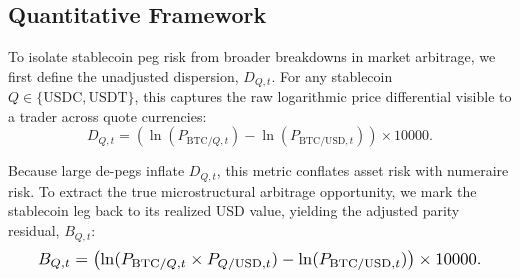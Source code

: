 \documentclass[12pt,twocolumn]{article}
\begin{document}
\begin{table}[H]
\label{tab:data_coverage}
\footnotesize
{}
\caption{1-minute data coverage and forward-fill exposure on the unified UTC grid. Coverage = non-missing share; FF share = carry-forward share (max 5 minutes).}
\end{table}

\subsection{Quantitative Framework}

To isolate stablecoin peg risk from broader breakdowns in market arbitrage, we first define the {unadjusted dispersion}, $D_{Q,t}$. For any stablecoin $Q\in\{\text{USDC}, \text{USDT}\}$, this captures the raw logarithmic price differential visible to a trader across quote currencies:
\begin{equation}
    D_{Q,t}=\left(\ln(P_{\text{BTC}/Q,t})-\ln(P_{\text{BTC/USD},t})\right)\times 10000.
\end{equation}

Because large de-pegs inflate $D_{Q,t}$, this metric conflates asset risk with numeraire risk. To extract the true microstructural arbitrage opportunity, we mark the stablecoin leg back to its realized USD value, yielding the {adjusted parity residual}, $B_{Q,t}$:
\begin{equation}
    \resizebox{0.92\columnwidth}{!}{$\displaystyle
    B_{Q,t} = \left(\ln(P_{\text{BTC}/Q,t}\times P_{Q/\text{USD},t})-\ln(P_{\text{BTC/USD},t})\right)\times 10000.
    $}
\end{equation}
\end{document}
